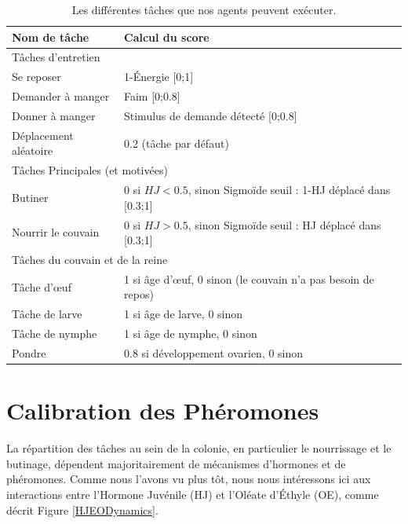 		\begin{table}
        \centering
        \caption{Les différentes tâches que nos agents peuvent exécuter.}
        \begin{tabular}{|l|l|}
            \hline
            Nom de tâche & Calcul du score\\
            \hline
            \hline
            \multicolumn{2}{|l|}{Tâches d'entretien}\\
            \hline
            Se reposer & 1-Énergie [0;1]\\
            Demander à manger & Faim [0;0.8] \\
            Donner à manger & Stimulus de demande détecté [0;0.8] \\
            Déplacement aléatoire & 0.2 (tâche par défaut) \\
            \hline
            \hline
            \multicolumn{2}{|l|}{Tâches Principales (et motivées)}\\
            \hline
            Butiner & 0 si $HJ<0.5$, sinon Sigmoïde seuil : 1-HJ déplacé dans [0.3;1] \\
            Nourrir le couvain & 0 si $HJ>0.5$, sinon Sigmoïde seuil : HJ déplacé dans [0.3;1] \\
            \hline
            \hline
            \multicolumn{2}{|l|}{Tâches du couvain et de la reine}\\
            \hline
            Tâche d'œuf & 1 si âge d'œuf, 0 sinon (le couvain n'a pas besoin de repos)\\
            Tâche de larve & 1 si âge de larve, 0 sinon\\
            Tâche de nymphe & 1 si âge de nymphe, 0 sinon \\
            Pondre & 0.8 si développement ovarien, 0 sinon\\
            \hline
            
        \end{tabular}
        \label{tableTasks}
    \end{table}
    
	\section{Calibration des Phéromones}
	
	La répartition des tâches au sein de la colonie, en particulier le nourrissage et le butinage, dépendent majoritairement de mécanismes d'hormones et de phéromones. Comme nous l'avons vu plus tôt, nous nous intéressons ici aux interactions entre l'Hormone Juvénile (HJ) et l'Oléate d'Éthyle (OE), comme décrit Figure \ref{HJEODynamics}.
	
